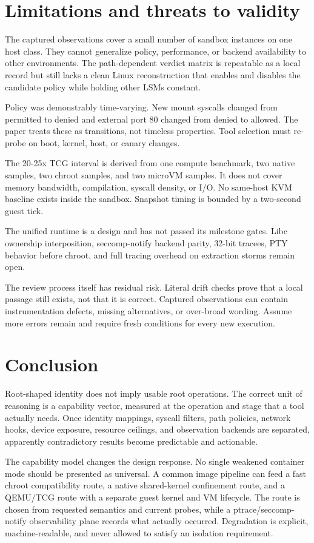 \documentclass[10pt,twocolumn]{article}
\begin{document}
\section{Limitations and threats to validity}
The captured observations cover a small number of sandbox instances on one host class. They cannot generalize policy, performance, or backend availability to other environments. The path-dependent verdict matrix is repeatable as a local record but still lacks a clean Linux reconstruction that enables and disables the candidate policy while holding other LSMs constant.

Policy was demonstrably time-varying. New mount syscalls changed from permitted to denied and external port 80 changed from denied to allowed. The paper treats these as transitions, not timeless properties. Tool selection must re-probe on boot, kernel, host, or canary changes.

The 20-25x TCG interval is derived from one compute benchmark, two native samples, two chroot samples, and two microVM samples. It does not cover memory bandwidth, compilation, syscall density, or I/O. No same-host KVM baseline exists inside the sandbox. Snapshot timing is bounded by a two-second guest tick.

The unified runtime is a design and has not passed its milestone gates. Libc ownership interposition, seccomp-notify backend parity, 32-bit tracees, PTY behavior before chroot, and full tracing overhead on extraction storms remain open.

The review process itself has residual risk. Literal drift checks prove that a local passage still exists, not that it is correct. Captured observations can contain instrumentation defects, missing alternatives, or over-broad wording. Assume more errors remain and require fresh conditions for every new execution.

\section{Conclusion}
Root-shaped identity does not imply usable root operations. The correct unit of reasoning is a capability vector, measured at the operation and stage that a tool actually needs. Once identity mappings, syscall filters, path policies, network hooks, device exposure, resource ceilings, and observation backends are separated, apparently contradictory results become predictable and actionable.

The capability model changes the design response. No single weakened container mode should be presented as universal. A common image pipeline can feed a fast chroot compatibility route, a native shared-kernel confinement route, and a QEMU/TCG route with a separate guest kernel and VM lifecycle. The route is chosen from requested semantics and current probes, while a ptrace/seccomp-notify observability plane records what actually occurred. Degradation is explicit, machine-readable, and never allowed to satisfy an isolation requirement.
\end{document}
